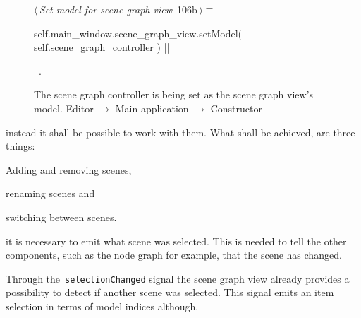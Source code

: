 \documentclass[%
    a4paper,    %
    justified,  %
    nobib,      %
    openany     %
]{tufte-book}
\makeatletter
\renewcommand{\label}[1]{\@tufte@label{##1}}%
\makeatother
\begin{document}
\begin{figure}[!htbp]
\begin{flushleft} \small
\begin{minipage}{\linewidth}\label{scrap41}\raggedright\small
{} $\langle\,${\itshape Set model for scene graph view}\nobreak\ {\footnotesize {106b}}$\,\rangle\equiv$
\vspace{-1ex}
\begin{pythoncode}
self.main_window.scene_graph_view.setModel(
    self.scene_graph_controller
)
|\NWsep|
\end{pythoncode}
\vspace{1.5ex}
\footnotesize
\begin{list}{}{\setlength{\itemsep}{-\parsep}\setlength{\itemindent}{-\leftmargin}}
\item \NWtxtMacroRefIn\ .

\item{}
\end{list}
\end{minipage}\vspace{4ex}
\end{flushleft}
\caption{The scene graph controller is being set as the scene graph view's
  model.
  \newline{}\newline{}Editor $\rightarrow$ Main application
  $\rightarrow$ Constructor}
\end{figure}

 instead it shall be
possible to work with them. What shall be achieved, are three things:
\begin{enumerate*}
  \item Adding and removing scenes,
  \item renaming scenes and
  \item switching between scenes.
\end{enumerate*}

 it is necessary to emit what scene was
selected. This is needed to tell the other components, such as the node graph
for example, that the scene has changed.

Through the~\verb=selectionChanged= signal the scene graph view already provides
a possibility to detect if another scene was selected. This signal emits an item
selection in terms of model indices although.
\end{document}
